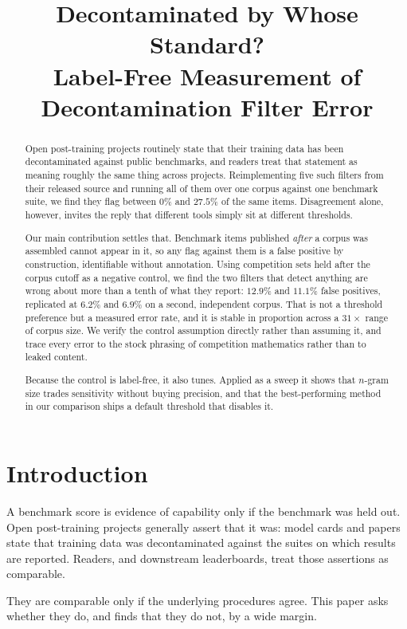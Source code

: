 \documentclass[11pt]{article}
\title{Decontaminated by Whose Standard?\\
Label-Free Measurement of Decontamination Filter Error}
\begin{document}
\maketitle

\begin{abstract}
Open post-training projects routinely state that their training data has been
decontaminated against public benchmarks, and readers treat that statement as
meaning roughly the same thing across projects. Reimplementing five such filters
from their released source and running all of them over one corpus against one
benchmark suite, we find they flag between $0\%$ and $27.5\%$ of the same items.
Disagreement alone, however, invites the reply that different tools simply sit at
different thresholds.

Our main contribution settles that. Benchmark items published \emph{after} a
corpus was assembled cannot appear in it, so any flag against them is a false
positive by construction, identifiable without annotation. Using competition sets
held after the corpus cutoff as a negative control, we find the two filters that
detect anything are wrong about more than a tenth of what they report:
$12.9\%$ and $11.1\%$ false positives, replicated at $6.2\%$ and $6.9\%$ on a
second, independent corpus. That is not a threshold preference but a measured
error rate, and it is stable in proportion across a $31\times$ range of corpus
size. We verify the control assumption directly rather than assuming it, and trace
every error to the stock phrasing of competition mathematics rather than to leaked
content.

Because the control is label-free, it also tunes. Applied as a sweep it shows that
$n$-gram size trades sensitivity without buying precision, and that the
best-performing method in our comparison ships a default threshold that disables
it.
\end{abstract}

\section{Introduction}

A benchmark score is evidence of capability only if the benchmark was held out.
Open post-training projects generally assert that it was: model cards and papers
state that training data was decontaminated against the suites on which results
are reported. Readers, and downstream leaderboards, treat those assertions as
comparable.

They are comparable only if the underlying procedures agree. This paper asks
whether they do, and finds that they do not, by a wide margin.
\end{document}
